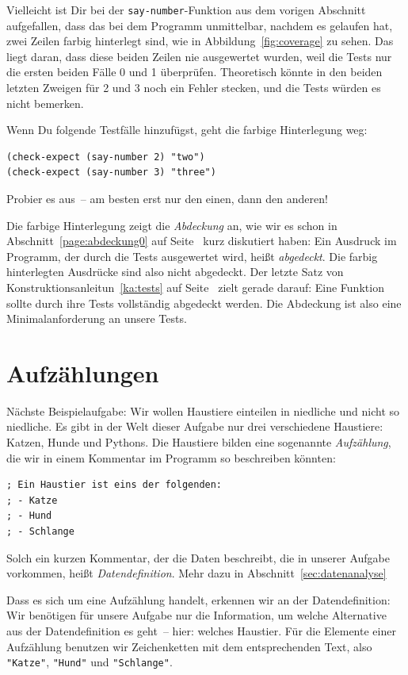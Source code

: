 Vielleicht ist Dir bei der \texttt{say-number}-Funktion aus dem
vorigen Abschnitt aufgefallen, dass das bei dem Programm unmittelbar, nachdem
es gelaufen hat, zwei Zeilen farbig
hinterlegt sind, wie in Abbildung~\ref{fig:coverage} zu sehen.  Das liegt
daran, dass diese beiden Zeilen nie ausgewertet wurden, weil die
Tests nur die ersten beiden Fälle 0 und 1 überprüfen.  Theoretisch
könnte in den beiden letzten Zweigen für 2 und 3 noch ein Fehler
stecken, und die Tests würden es nicht bemerken.

Wenn Du folgende Testfälle hinzufügst, geht die farbige Hinterlegung weg:
%
\begin{verbatim}
(check-expect (say-number 2) "two")
(check-expect (say-number 3) "three")
\end{verbatim}
%
Probier es aus~-- am besten erst nur den einen, dann den anderen!

Die farbige Hinterlegung zeigt die \textit{Abdeckung} an, wie wir es
schon in Abschnitt~\ref{page:abdeckung0} auf
Seite~\pageref{page:abdeckung0} kurz diskutiert haben: Ein Ausdruck im
Programm, der durch die Tests ausgewertet wird, heißt
\textit{abgedeckt}.  Die farbig hinterlegten Ausdrücke sind also nicht
abgedeckt.  Der letzte Satz von Konstruktionsanleitun~\ref{ka:tests}
auf Seite~\pageref{ka:tests} zielt gerade darauf: Eine Funktion sollte
durch ihre Tests vollständig abgedeckt werden.  Die Abdeckung ist also
eine Minimalanforderung an unsere Tests.

\section{Aufzählungen}

Nächste Beispielaufgabe: Wir wollen Haustiere einteilen in niedliche
und nicht so niedliche.  Es gibt in der Welt dieser Aufgabe nur drei
verschiedene Haustiere: Katzen, Hunde und Pythons.  Die Haustiere
bilden eine sogenannte \textit{Aufzählung}, die wir
in einem Kommentar im Programm so beschreiben könnten:
%
\label{sec:datendefinition}
\begin{verbatim}
; Ein Haustier ist eins der folgenden:
; - Katze
; - Hund
; - Schlange
\end{verbatim}
%
Solch ein kurzen Kommentar, der die Daten beschreibt, die in unserer
Aufgabe vorkommen, heißt
\textit{Datendefinition}.  Mehr dazu in Abschnitt~\ref{sec:datenanalyse}

Dass es sich um eine Aufzählung handelt, erkennen wir an der
Datendefinition: Wir benötigen für unsere Aufgabe nur die Information,
um welche Alternative aus der Datendefinition es geht~-- hier: welches
Haustier.  Für die Elemente einer Aufzählung benutzen wir 
Zeichenketten mit dem entsprechenden Text, also \verb|"Katze"|,
\verb|"Hund"| und \verb|"Schlange"|.

